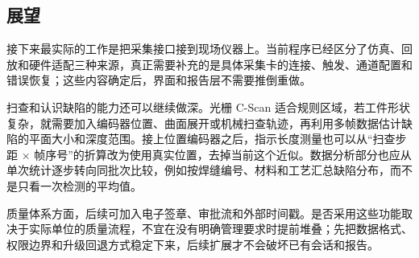 \subsection{展望}
\par
接下来最实际的工作是把采集接口接到现场仪器上。当前程序已经区分了仿真、回放和硬件适配三种来源，真正需要补充的是具体采集卡的连接、触发、通道配置和错误恢复；这些内容确定后，界面和报告层不需要推倒重做。
\par
扫查和认识缺陷的能力还可以继续做深。光栅 C-Scan 适合规则区域，若工件形状复杂，就需要加入编码器位置、曲面展开或机械扫查轨迹，再利用多帧数据估计缺陷的平面大小和深度范围。接上位置编码器之后，指示长度测量也可以从“扫查步距 × 帧序号”的折算改为使用真实位置，去掉当前这个近似。数据分析部分也应从单次统计逐步转向同批次比较，例如按焊缝编号、材料和工艺汇总缺陷分布，而不是只看一次检测的平均值。
\par
质量体系方面，后续可加入电子签章、审批流和外部时间戳。是否采用这些功能取决于实际单位的质量流程，不宜在没有明确管理要求时提前堆叠；先把数据格式、权限边界和升级回退方式稳定下来，后续扩展才不会破坏已有会话和报告。
